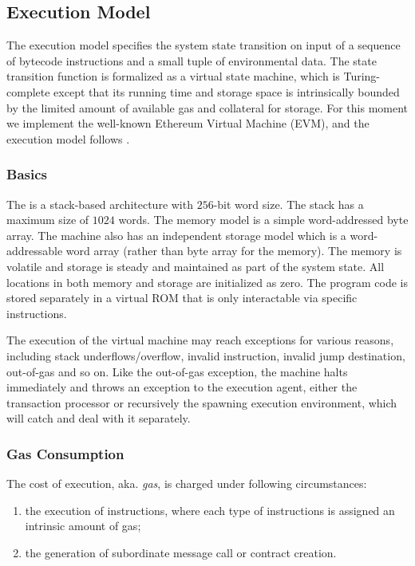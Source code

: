 

\subsection{Execution Model}
\label{sec:exe model}

The execution model specifies the system state transition on input of a sequence of bytecode instructions and a small tuple of environmental data. 
The state transition function is formalized as a virtual state machine,
which 
is Turing-complete except that its running time and storage space is intrinsically bounded by the limited amount of available gas and collateral for storage.
% 
For this moment we implement the well-known Ethereum Virtual Machine (EVM), and the execution model follows \cite{ETH_yellow}.


\subsubsection{Basics}

The \cvm is a stack-based architecture with $256$-bit word size.
The stack has a maximum size of $1024$ words.
The memory model is a simple word-addressed byte array.  
The machine also has an independent storage model which is a word-addressable word array (rather than byte array for the memory). 
The memory is volatile and storage is steady and maintained as part of the system state. 
All locations in both memory and storage are initialized as zero.
The program code is stored separately in a virtual ROM that is only interactable via specific instructions.

The execution of the virtual machine may reach exceptions for various reasons, including stack underflows/overflow, invalid instruction, invalid jump destination, out-of-gas and so on.
Like the out-of-gas exception, the machine halts immediately and throws an exception to the execution agent, either the transaction processor or recursively the spawning execution environment, which will catch and deal with it separately. 



\subsubsection{Gas Consumption}

The cost of execution, aka. \emph{gas}, is charged under following circumstances:
\begin{enumerate}[nosep]
	\item the execution of instructions, where each type of instructions is assigned an intrinsic amount of gas;

	\item the generation of subordinate message call or contract creation.

\end{enumerate}


